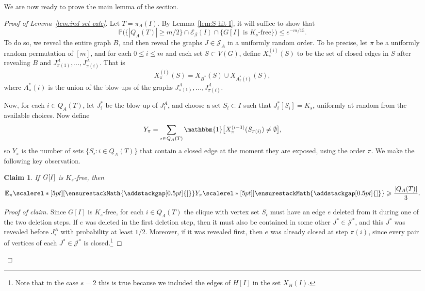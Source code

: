 \documentclass[12pt,reqno]{amsart}
\newcommand\pig[1]{\scalerel*[5pt]{\normalsize#1}{%
  \ensurestackMath{\addstackgap[0.5pt]{\normalsize#1}}}}
\newtheorem{claim}[theorem]{Claim}
\theoremstyle{remark}
\numberwithin{theorem}{section}
\renewcommand{\(}{\bigl(}
\renewcommand{\)}{\bigr)\vphantom{)}}
\newcommand{\ina}{\hspace{0.02cm}\in\hspace{0.02cm}}
\newcommand{\cE}{\mathcal E}
\newcommand{\cJ}{\mathcal J}
\def\1{\mathbbm{1}}
\renewcommand{\le}{\leqslant}
\renewcommand{\ge}{\geqslant}
\newcommand{\Ex}{\mathbb E}
\renewcommand{\Pr}{\mathbb{P}}
\begin{document}
We are now ready to prove the main lemma of the section. 

\begin{proof}[Proof of Lemma~\ref{lem:ind-set-calc}] 
Let $T = \pi_A(I)$. By Lemma~\ref{lem:S-hit-I}, it will suffice to show that 
\begin{equation}\label{eq:ind-set-calc:aim}
\Pr\Big( \big\{ |Q_A(T)| \ge m/2 \big\} \cap \cE_\beta(I) \cap \big\{ G[I] \text{ is $K_s$-free} \big\} \Big) \le e^{-m/15}.
\end{equation}
To do so, we reveal the entire graph $B$, and then reveal the graphs $J \in \cJ_A$ in a uniformly random order. To be precise, let $\pi$ be a uniformly random permutation of $[m]$, and for each $0 \le i \le m$ and each set $S \subset V(G)$, define $X_\pi^{(i)}(S)$ to be the set of closed edges in $S$ after revealing $B$ and  $J^A_{\pi(1)},\ldots,J^A_{\pi(i)}$. That is
$$X_\pi^{(i)}(S) = X_{B^*}(S) \cup X_{A_\pi^*(i)}(S),$$
where $A_\pi^*(i)$ is the union of the blow-ups of the graphs $J^A_{\pi(1)},\ldots,J^A_{\pi(i)}$. 

Now, for each $i \in Q_A(T)$, let $J_i^*$ be the blow-up of $J_i^A$, and choose a set $S_i \subset I$ such that $J_i^*[S_i] = K_s$, uniformly at random from the available choices. Now define
$$Y_\pi = \sum_{i \ina Q_A(T)} \1\big[ X_\pi^{(i-1)}(S_{\pi(i)}) \ne \emptyset \big],$$
so $Y_\pi$ is the number of sets $\{ S_i : i \in Q_A(T) \}$ that contain a closed edge at the moment they are exposed, using the order $\pi$. We make the following key observation. 

\begin{claim}\label{permutation:claim}
If $\hspace{0.03cm} G[I]$ is $K_s$-free, then 
$$\Ex_\pi\pig[ Y_\pi \pig] \ge \frac{|Q_A(T)|}{3}.$$
\end{claim}

\begin{proof}[Proof of claim] 
Since $G[I]$ is $K_s$-free, for each $i \in Q_A(T)$ the clique with vertex set $S_i$ must have an edge $e$ deleted from it during one of the two deletion steps. If $e$ was deleted in the first deletion step, then it must also be contained in some other $J^* \in \cJ^*$, and this $J^*$ was revealed before $J^A_i$ with probability at least $1/2$. Moreover, if it was revealed first, then $e$ was already closed at step $\pi(i)$, since every pair of vertices of each $J^* \in \cJ^*$ is closed.\footnote{Note that in the case $s = 2$ this is true because we included the edges of $H[I]$ in the set $X_H(I)$.} 


\end{proof}
\end{proof}
\end{document}
